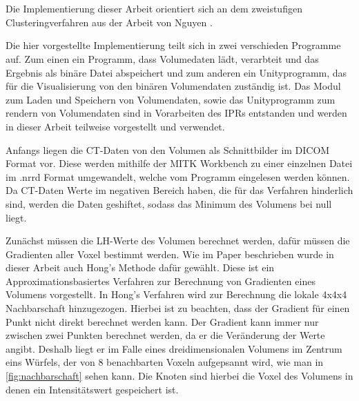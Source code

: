 \chapter{}
\label{sec:methods}


Die Implementierung dieser Arbeit orientiert sich an dem zweistufigen Clusteringverfahren aus der Arbeit von Nguyen \cite{nguyen2012clustering}.
 
Die hier vorgestellte Implementierung teilt sich in zwei verschieden Programme auf. Zum einen ein Programm, dass Volumedaten lädt, verarbteit und das Ergebnis als binäre Datei abspeichert und zum anderen ein Unityprogramm, das für die Visualisierung von den binären Volumendaten zuständig ist. 
Das Modul zum Laden und Speichern von Volumendaten, sowie das Unityprogramm zum rendern von Volumendaten sind in Vorarbeiten des IPRs entstanden und  werden in dieser Arbeit teilweise vorgestellt und verwendet. 

Anfangs liegen die CT-Daten von den Volumen als Schnittbilder im DICOM Format vor. Diese werden mithilfe der MITK Workbench zu einer einzelnen Datei im .nrrd Format umgewandelt, welche vom Programm eingelesen werden können.
Da CT-Daten Werte im negativen Bereich haben, die für  das Verfahren hinderlich sind, werden die Daten geshiftet, sodass das Minimum des Volumens bei null liegt.


Zunächst müssen die LH-Werte des Volumen berechnet werden, dafür müssen die Gradienten aller Voxel bestimmt werden. Wie im Paper beschrieben wurde in dieser Arbeit auch Hong's Methode \cite{hong2003method} dafür gewählt.
Diese ist ein Approximationsbasiertes Verfahren zur Berechnung von Gradienten eines Volumens vorgestellt. 
\newline
 In Hong's Verfahren wird zur Berechnung die lokale 4x4x4 Nachbarschaft hinzugezogen. Hierbei ist zu beachten, dass der Gradient für einen Punkt nicht direkt berechnet werden kann. Der Gradient kann immer nur zwischen zwei Punkten berechnet werden, da er die Veränderung der Werte angibt. Deshalb liegt er im Falle eines dreidimensionalen Volumens im Zentrum eins Würfels, der von 8 benachbarten Voxeln aufgepsannt wird, wie man in \autoref{fig:nachbarschaft} sehen kann. Die Knoten sind hierbei die Voxel des Volumens in denen ein Intensitätswert gespeichert ist.
\newline

